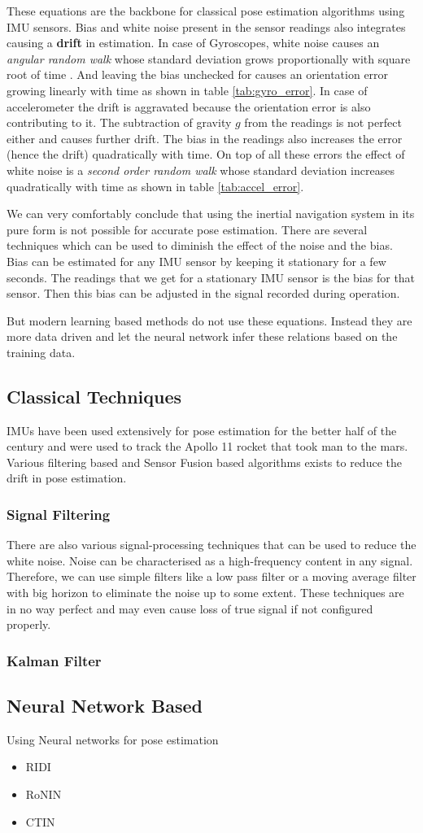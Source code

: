 These equations are the backbone for classical pose estimation algorithms using IMU sensors. Bias and white noise present in the sensor readings also integrates causing a \textbf{drift} in estimation. In case of Gyroscopes, white noise causes an \textit{angular random walk} whose standard deviation grows proportionally with square root of time \citep{woodman2007introduction}. And leaving the bias unchecked for causes an orientation error growing linearly with time as shown in table  \ref{tab:gyro_error}. In case of accelerometer the drift is aggravated because the orientation error is also contributing to it. The subtraction of gravity $ g $ from the readings is not perfect either and causes further drift. The bias in the readings also increases the error (hence the drift) quadratically with time. On top of all these errors the effect of white noise  is a \textit{second order random walk} whose standard deviation increases quadratically with time as shown in table \ref{tab:accel_error}.

We can very comfortably conclude that using the inertial navigation system in its pure form is not possible for accurate pose estimation. There are several techniques which can be used to diminish the effect of the noise and the bias. Bias can be estimated for any IMU sensor by keeping it stationary for a few seconds. The readings that we get for a stationary IMU sensor is the bias for that sensor. Then this bias can be adjusted in the signal recorded during operation.

But modern learning based methods do not use these equations. Instead they are more data driven and let the neural network infer these relations based on the training data.

\subsection{Classical Techniques}
IMUs have been used extensively for pose estimation for the better half of the century and were used to track the Apollo 11 rocket that took man to the mars. Various filtering based and Sensor Fusion based algorithms exists to reduce the drift in pose estimation. 

\subsubsection{Signal Filtering}
There are also various signal-processing techniques that can be used to reduce the white noise. Noise can be characterised as a high-frequency content in any signal. Therefore, we can use simple filters like a low pass filter or a moving average filter with big horizon to eliminate the noise up to some extent. These techniques are in no way perfect and may even cause loss of true signal if not configured properly.

\subsubsection{Kalman Filter}



\subsection{Neural Network Based}
Using Neural networks for pose estimation
\begin{itemize}
\item RIDI
\item RoNIN
\item CTIN
\end{itemize}